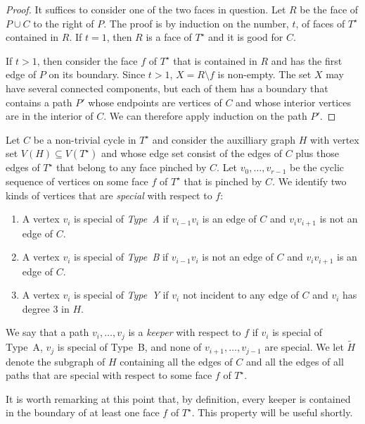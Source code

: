 \documentclass{patmorin}
\newcommand{\dual}[1]{{#1}^\star}
\begin{document}
\begin{proof}
   It suffices to consider one of the two faces in question. Let $R$
   be the face of $P\cup C$ to the right of $P$.  The proof
   is by induction on the number, $t$, of faces of $\dual{T}$ contained
   in $R$.  If $t=1$, then $R$ is a face of $\dual{T}$ and it is good
   for $C$.

   If $t>1$, then consider the face $f$ of $\dual{T}$ that is contained
   in $R$ and has the first edge of $P$ on its boundary.  Since $t>1$,
   $X=R\setminus f$ is non-empty. The set $X$ may have several connected
   components, but each of them has a boundary that contains a path $P'$
   whose endpoints are vertices of $C$ and whose interior vertices are
   in the interior of $C$.  We can therefore apply induction on the
   path $P'$.
\end{proof}

Let $C$ be a non-trivial cycle in $\dual{T}$ and consider the auxilliary
graph $H$ with vertex set $V(H)\subseteq V(\dual{T})$ and whose edge set
consist of the edges of $C$ plus those edges of $\dual{T}$ that belong
to any face pinched by $C$.  Let $v_0,\ldots,v_{r-1}$ be the cyclic sequence of vertices on some face $f$ of $\dual{T}$ that is pinched by $C$.  
We identify two kinds of vertices that are \emph{special} with respect to $f$:
\begin{enumerate}
  \item A vertex $v_i$ is special of \emph{Type~A} if $v_{i-1}v_i$ is an edge of $C$ and $v_iv_{i+1}$ is not an edge of $C$.
  \item A vertex $v_i$ is special of \emph{Type~B} if $v_{i-1}v_i$ is not an edge of $C$ and $v_iv_{i+1}$ is an edge of $C$.
  \item A vertex $v_i$ is special of \emph{Type~Y} if $v_i$ not incident to any edge of $C$ and $v_i$ has degree 3 in $H$.
\end{enumerate}

We say that a path $v_i,\ldots,v_j$ is a \emph{keeper} with respect to
$f$ if $v_i$ is special of Type~A, $v_j$ is special of Type~B, and none
of $v_{i+1},\ldots,v_{j-1}$ are special.  We let $\tilde{H}$ denote the
subgraph of $H$ containing all the edges of $C$ and all the edges of
all paths that are special with respect to some face $f$ of $\dual{T}$.

It is worth remarking at this point that, by definition, every keeper
is contained in the boundary of at least one face $f$ of $\dual{T}$.
This property will be useful shortly.
\end{document}
